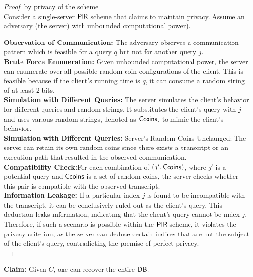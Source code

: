 {\begin{proof}
by privacy of the scheme \\

Consider a single-server ${\sf PIR}$ scheme that claims to maintain privacy. Assume an adversary (the server) with unbounded computational power).


\textbf{Observation of Communication:} The adversary observes a communication pattern which is feasible for a query $q$ but not for another query $j$. \\

\textbf{Brute Force Enumeration:} 
 Given unbounded computational power, the server can enumerate over all possible random coin configurations of the client. This is feasible because if the client's running time is $q$, it can consume a random string of at least 2 bits. \\

\textbf{Simulation with Different Queries: } The server simulates the client's behavior for different queries and random strings. It substitutes the client's query with $j$ and uses various random strings, denoted as ${\sf Ccoins}$, to mimic the client's behavior. \\

\textbf{Simulation with Different Queries: }
Server's Random Coins Unchanged: The server can retain its own random coins since there exists a transcript or an execution path that resulted in the observed communication.\\

\textbf{Compatibility Check:}For each combination of $(j', {\sf Ccoins})$, where $j'$ is a potential query and ${\sf Ccoins}$ is a set of random coins, the server checks whether this pair is compatible with the observed transcript.\\

\textbf{Information Leakage:} If a particular index $j$ is found to be incompatible with the transcript, it can be conclusively ruled out as the client's query. This deduction leaks information, indicating that the client's query cannot be index $j$. \\

Therefore, if such a scenario is possible within the ${\sf PIR}$ scheme, it violates the privacy criterion, as the server can deduce certain indices that are not the subject of the client's query, contradicting the premise of perfect privacy.\\
\end{proof}


\textbf{Claim:} Given $C$, one can recover the entire ${\sf DB}$.

}
